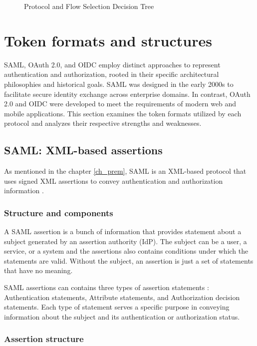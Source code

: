 \documentclass[../memoire.tex]{subfiles}
\begin{document}
\begin{figure}[H]
{\begin{tikzpicture}
\end{tikzpicture}
} 
\caption{Protocol and Flow Selection Decision Tree}
\label{fig:flow_decision_tree}
\end{figure}

\section{Token formats and structures}

SAML, OAuth 2.0, and OIDC employ distinct approaches to represent authentication and authorization, rooted in their specific architectural philosophies and historical goals. SAML was designed in the early 2000s to facilitate secure identity exchange across enterprise domains. In contrast, OAuth 2.0 and OIDC were developed to meet the requirements of modern web and mobile applications. This section examines the token formats utilized by each protocol and analyzes their respective strengths and weaknesses.

\subsection{SAML: XML-based assertions}

As mentioned in the chapter \ref{ch_prem}, SAML is an XML-based protocol that uses signed XML assertions to convey authentication and authorization information \cite{oasissaml}. 
\subsubsection*{Structure and components}

A SAML assertion is a bunch of information that provides statement about a subject generated by an assertion authority (IdP). The subject can be a user, a service, or a system and the assertions also contains conditions under which the statements are valid. Without the subject, an assertion is just a set of statements that have no meaning. 

SAML assertions can contains three types of assertion statements \cite{oasissaml}: Authentication statements, Attribute statements, and Authorization decision statements. Each type of statement serves a specific purpose in conveying information about the subject and its authentication or authorization status.

\subsubsection*{Assertion structure}
\end{document}
